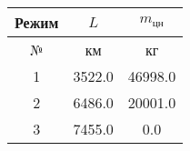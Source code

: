 \begin{tabular}{|c|c|c|}
\hline
Режим & $L$ & $m_{цн}$ \\ 
\hline
№ & км & кг \\ 
\hline
1 & 3522.0 & 46998.0 \\ 
\hline
2 & 6486.0 & 20001.0 \\ 
\hline
3 & 7455.0 & 0.0 \\ 
\hline
\end{tabular}